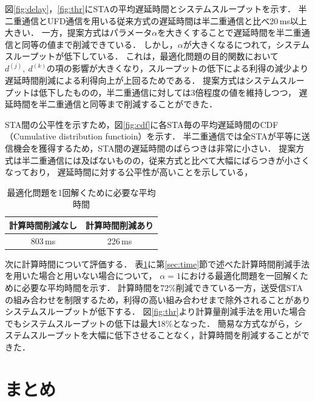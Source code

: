 \documentclass[master]{kuisthesis}		%
\begin{document}
		\par
		図\ref{fig:delay}，\ref{fig:thr}にSTAの平均遅延時間とシステムスループットを示す．
		半二重通信とUFD通信を用いる従来方式の遅延時間は半二重通信と比べ20\,ms以上大きい．
		一方，提案方式はパラメータ$\alpha$を大きくすることで遅延時間を半二重通信と同等の値まで削減できている．
		しかし，$\alpha$が大きくなるにつれて，システムスループットが低下している．
		これは，最適化問題の目的関数において$d^{(j)},\ d^{(k)}$の項の影響が大きくなり，スループットの低下による利得の減少より遅延時間削減による利得向上が上回るためである．
		提案方式はシステムスループットは低下したものの，半二重通信に対しては3倍程度の値を維持しつつ，
		遅延時間を半二重通信と同等まで削減することができた．
		\par
		STA間の公平性を示すため，図\ref{fig:cdf}に各STA毎の平均遅延時間のCDF（Cumulative distribution functioin）を示す．
		半二重通信では全STAが平等に送信機会を獲得するため，STA間の遅延時間のばらつきは非常に小さい．
		提案方式は半二重通信には及ばないものの，従来方式と比べて大幅にばらつきが小さくなっており，
		遅延時間に対する公平性が高いことを示している，

		\begin{table}[t]
			\centering
			\caption{最適化問題を1回解くために必要な平均時間}
			\label{tab:time}
			\begin{tabular}{cc}
			 計算時間削減なし & 計算時間削減あり\\ \hline
			 803\,ms & 226\,ms \\\hline
			\end{tabular}
		\end{table}

		\par
		次に計算時間について評価する．
		表\ref{tab:time}に第\ref{sec:time}節で述べた計算時間削減手法を用いた場合と用いない場合について，
		$\alpha=1$における最適化問題を一回解くために必要な平均時間を示す．
		計算時間を72\%削減できている一方，送受信STAの組み合わせを制限するため，利得の高い組み合わせまで除外されることがありシステムスループットが低下する．
		図\ref{fig:thr}より計算量削減手法を用いた場合でもシステムスループットの低下は最大18\%となった．
		簡易な方式ながら，システムスループットを大幅に低下させることなく，計算時間を削減することができた．

\section{まとめ}
\end{document}
